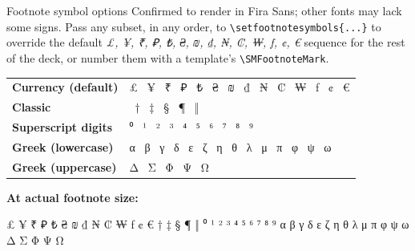 %

\begin{standardframe}{Footnote symbol options}
\footnotesize
Confirmed to render in Fira Sans; other fonts may lack some signs. Pass any subset, in any order, to
\texttt{\textbackslash setfootnotesymbols\{...\}} to
override the default \emph{£, ¥, ₹, ₽, ₺, ₴, ₪, ₫, ₦, ₡, ₩, ƒ, ¢, €} sequence
for the rest of the deck, or number them with a template's \texttt{\textbackslash SMFootnoteMark}.

\vspace{0.4em}
{\renewcommand{\arraystretch}{1.7}\setlength{\tabcolsep}{4pt}
\begin{tabular}{@{}l l@{}}
\textbf{\footnotesize Currency (default)} & {\Large £ \ ¥ \ ₹ \ ₽ \ ₺ \ ₴ \ ₪ \ ₫ \ ₦ \ ₡ \ ₩ \ ƒ \ ¢ \ €} \\
\textbf{\footnotesize Classic} & {\Large * \ † \ ‡ \ § \ ¶ \ ‖} \\
\textbf{\footnotesize Superscript digits} & {\Large ⁰ \ ¹ \ ² \ ³ \ ⁴ \ ⁵ \ ⁶ \ ⁷ \ ⁸ \ ⁹} \\
\textbf{\footnotesize Greek (lowercase)} & {\Large α \ β \ γ \ δ \ ε \ ζ \ η \ θ \ λ \ μ \ π \ φ \ ψ \ ω} \\
\textbf{\footnotesize Greek (uppercase)} & {\Large Δ \ Σ \ Φ \ Ψ \ Ω} \\
\end{tabular}}

\vspace{0.6em}
\textbf{\footnotesize At actual footnote size:}\\
{\fontsize{3.2}{4.5}\selectfont
£ ¥ ₹ ₽ ₺ ₴ ₪ ₫ ₦ ₡ ₩ ƒ ¢ € \quad * † ‡ § ¶ ‖ \quad ⁰ ¹ ² ³ ⁴ ⁵ ⁶ ⁷ ⁸ ⁹ \quad α β γ δ ε ζ η θ λ μ π φ ψ ω \quad Δ Σ Φ Ψ Ω
\par}

\end{standardframe}
